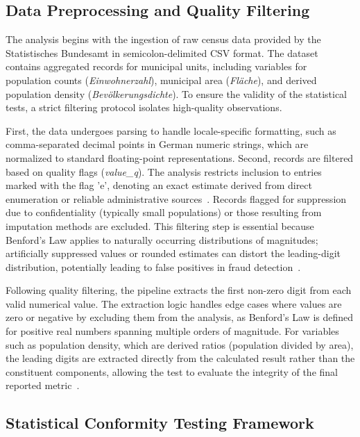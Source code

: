 \documentclass[11pt,a4paper]{article}
\begin{document}
\subsection{Data Preprocessing and Quality Filtering}

The analysis begins with the ingestion of raw census data provided by the Statistisches Bundesamt in semicolon-delimited CSV format. The dataset contains aggregated records for municipal units, including variables for population counts (\textit{Einwohnerzahl}), municipal area (\textit{Fläche}), and derived population density (\textit{Bevölkerungsdichte}). To ensure the validity of the statistical tests, a strict filtering protocol isolates high-quality observations.

First, the data undergoes parsing to handle locale-specific formatting, such as comma-separated decimal points in German numeric strings, which are normalized to standard floating-point representations. Second, records are filtered based on quality flags (\textit{value\_q}). The analysis restricts inclusion to entries marked with the flag 'e', denoting an exact estimate derived from direct enumeration or reliable administrative sources~\cite{Schafer2005AutomatieIO}. Records flagged for suppression due to confidentiality (typically small populations) or those resulting from imputation methods are excluded. This filtering step is essential because Benford's Law applies to naturally occurring distributions of magnitudes; artificially suppressed values or rounded estimates can distort the leading-digit distribution, potentially leading to false positives in fraud detection~\cite{Judge2012DetectingPI}.

Following quality filtering, the pipeline extracts the first non-zero digit from each valid numerical value. The extraction logic handles edge cases where values are zero or negative by excluding them from the analysis, as Benford's Law is defined for positive real numbers spanning multiple orders of magnitude. For variables such as population density, which are derived ratios (population divided by area), the leading digits are extracted directly from the calculated result rather than the constituent components, allowing the test to evaluate the integrity of the final reported metric~\cite{Druica2018BenfordsLA}.

\subsection{Statistical Conformity Testing Framework}
\end{document}
